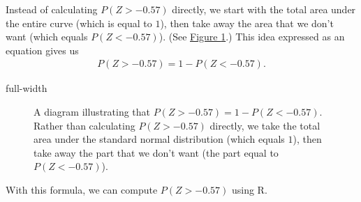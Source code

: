 \documentclass[letterpaper,10pt,english]{jupyterBook}
\begin{document}
\sphinxAtStartPar
Instead of calculating \(P(Z > -0.57)\) directly, we start with the total area under the entire curve (which is equal to \(1\)), then take away the area that we don’t want (which equals \(P(Z < -0.57)\)). (See \hyperref[\detokenize{Ch4 The Normal Distribution and the Central Limit Theorem/4.2 The Standard Normal Distribution:stdnormals-rtail-eqn}]{Figure \ref{\detokenize{Ch4 The Normal Distribution and the Central Limit Theorem/4.2 The Standard Normal Distribution:stdnormals-rtail-eqn}}}.) This idea expressed as an equation gives us
\begin{equation*}
\begin{split} P(Z > -0.57) = 1 - P(Z < -0.57). \end{split}
\end{equation*}
\begin{sphinxuseclass}{full-width}
\begin{figure}[htbp]
\centering
\capstart

\noindent{}
\caption{A diagram illustrating that \(P(Z > -0.57) = 1 - P(Z < -0.57)\). Rather than calculating \(P(Z > -0.57)\) directly, we take the total area under the standard normal distribution (which equals \(1\)), then take away the part that we don’t want (the part equal to \(P(Z < -0.57)\)).}\label{\detokenize{Ch4 The Normal Distribution and the Central Limit Theorem/4.2 The Standard Normal Distribution:stdnormals-rtail-eqn}}\end{figure}

\end{sphinxuseclass}
\sphinxAtStartPar
With this formula, we can compute \(P(Z > -0.57)\) using R.
\end{document}
